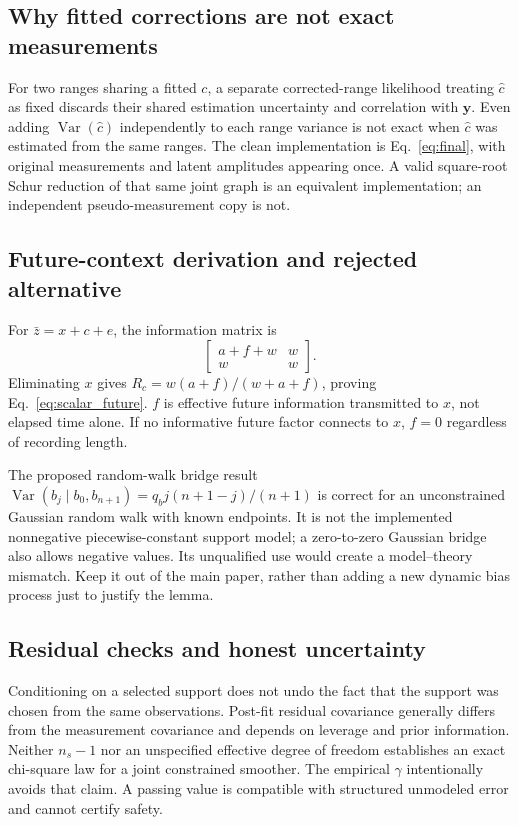 \documentclass[conference]{IEEEtran}%
\newcommand{\Var}{\operatorname{Var}}
\begin{document}
\subsection{Why fitted corrections are not exact measurements}
For two ranges sharing a fitted $c$, a separate corrected-range likelihood treating $\hat c$ as fixed discards their shared estimation uncertainty and correlation with $\mathbf y$. Even adding $\Var(\hat c)$ independently to each range variance is not exact when $\hat c$ was estimated from the same ranges. The clean implementation is Eq.~\eqref{eq:final}, with original measurements and latent amplitudes appearing once. A valid square-root Schur reduction of that same joint graph is an equivalent implementation; an independent pseudo-measurement copy is not.

\subsection{Future-context derivation and rejected alternative}
For $\bar z=x+c+e$, the information matrix is
\begin{equation}
 \begin{bmatrix}a+f+w&w\\w&w\end{bmatrix}.
\end{equation}
Eliminating $x$ gives $R_c=w(a+f)/(w+a+f)$, proving Eq.~\eqref{eq:scalar_future}. $f$ is effective future information transmitted to $x$, not elapsed time alone. If no informative future factor connects to $x$, $f=0$ regardless of recording length.

The proposed random-walk bridge result
$\Var(b_j\mid b_0,b_{n+1})=q_bj(n+1-j)/(n+1)$
is correct for an unconstrained Gaussian random walk with known endpoints. It is not the implemented nonnegative piecewise-constant support model; a zero-to-zero Gaussian bridge also allows negative values. Its unqualified use would create a model--theory mismatch. Keep it out of the main paper, rather than adding a new dynamic bias process just to justify the lemma.

\subsection{Residual checks and honest uncertainty}
Conditioning on a selected support does not undo the fact that the support was chosen from the same observations. Post-fit residual covariance generally differs from the measurement covariance and depends on leverage and prior information. Neither $n_s-1$ nor an unspecified effective degree of freedom establishes an exact chi-square law for a joint constrained smoother. The empirical $\gamma$ intentionally avoids that claim. A passing value is compatible with structured unmodeled error and cannot certify safety.
\end{document}
